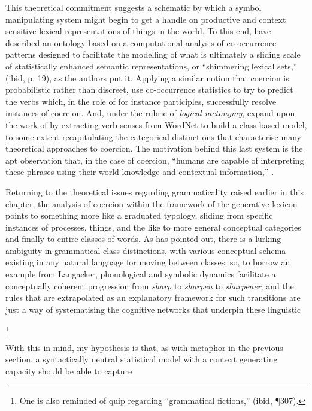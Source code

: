 This theoretical commitment suggests a schematic by which a symbol manipulating system might begin to get a handle on productive and context sensitive lexical representations of things in the world.  To this end, \cite{JezekEA2010} have described an ontology based on a computational analysis of co-occurrence patterns designed to facilitate the modelling of what is ultimately a sliding scale of statistically enhanced semantic representations, or ``shimmering lexical sets,'' (ibid, p. 19), as the authors put it.  Applying a similar notion that coercion is probabilistic rather than discreet, \cite{LapataEA2003} use co-occurrence statistics to try to predict the verbs which, in the role of for instance participles, successfully resolve instances of coercion.  And, under the rubric of \emph{logical metonymy}, \cite{ShutovaEA2013b} expand upon the work of \citeauthor{LapataEA2003} by extracting verb senses from WordNet to build a class based model, to some extent recapitulating the categorical distinctions that characterise many theoretical approaches to coercion.  The motivation behind this last system is the apt observation that, in the case of coercion, ``humans are capable of interpreting these phrases using their world knowledge and contextual information,'' \citep[][11:2]{ShutovaEA2013b}.

Returning to the theoretical issues regarding grammaticality raised earlier in this chapter, the analysis of coercion within the framework of the generative lexicon points to something more like a graduated typology, sliding from specific instances of processes, things, and the like to more general conceptual categories and finally to entire classes of words.  As \cite{Langacker1991} has pointed out, there is a lurking ambiguity in grammatical class distinctions, with various conceptual schema existing in any natural language for moving between classes: so, to borrow an example from Langacker, phonological and symbolic dynamics facilitate a conceptually coherent progression from \emph{sharp} to \emph{sharpen} to \emph{sharpener}, and the rules that are extrapolated as an explanatory framework for such transitions are just a way of systematising the cognitive networks that underpin these linguistic

\footnote{One is also reminded of  quip regarding ``grammatical fictions,'' (ibid, \P 307).}

With this in mind, my hypothesis is that, as with metaphor in the previous section, a syntactically neutral statistical model with a context generating capacity should be able to capture 

